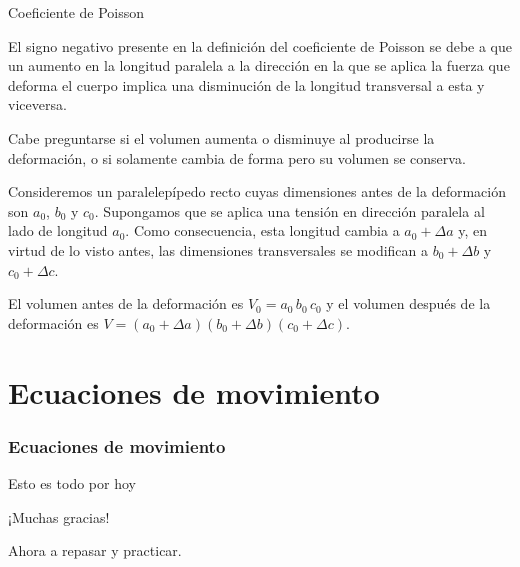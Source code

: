\documentclass[11pt,handout,aspectratio=1610]{beamer}
\newcommand{\vs}{\vspace{11pt}}
\begin{document}
\begin{frame}{Coeficiente de Poisson}

    El signo negativo presente en la definición del coeficiente de Poisson se debe a que un aumento en la longitud paralela a la dirección en la que se aplica la fuerza que deforma el cuerpo implica una disminución de la longitud transversal a esta y viceversa.

    \vs

    Cabe preguntarse si el volumen aumenta o disminuye al producirse la deformación, o si solamente cambia de forma pero su volumen se conserva.

    \vs 

    Consideremos un paralelepípedo recto cuyas dimensiones antes de la deformación son $a_0$, $b_0$ y $c_0$. Supongamos que se aplica una tensión en dirección paralela al lado de longitud $a_0$. Como consecuencia, esta longitud cambia a $a_0 + \Delta a$ y, en virtud de lo visto antes, las dimensiones transversales se modifican a $b_0 + \Delta b$ y $c_0 + \Delta c$.

    \vs 

    El volumen antes de la deformación es $V_0 = a_0 \, b_0 \, c_0$ y el volumen después de la deformación es $V = \left(a_0 + \Delta a\right) \left(b_0 + \Delta b\right) \left(c_0 + \Delta c\right)$.

\end{frame}

\section{Ecuaciones de movimiento}

\begin{frame}
    \frametitle{Ecuaciones de movimiento}

    

\end{frame}

\begin{frame}{Esto es todo por hoy}

    \begin{center}
        {\huge ¡Muchas gracias!}

        \vs

        Ahora a repasar y practicar.
    \end{center}

\end{frame}
\end{document}
